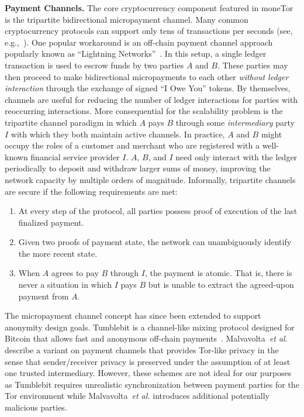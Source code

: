\medskip \noindent\textbf{Payment Channels.}
The core cryptocurrency component featured in moneTor is the tripartite bidirectional micropayment channel.
Many common cryptocurrency protocols can support only tens of transactions per seconds (see, e.g.,~\cite{team2018blockchain}).
One popular workaround is an off-chain payment channel approach popularly known as ``Lightning Networks''~\cite{poon2016bitcoin}.
In this setup, a single ledger transaction is used to escrow funds by two parties $A$ and $B$.
These parties may then proceed to make bidirectional micropayments to each other \emph{without ledger interaction} through the exchange of signed ``I Owe You'' tokens.
By themselves, channels are useful for reducing the number of ledger interactions for parties with reoccurring interactions.
More consequential for the scalability problem is the tripartite channel paradigm in which $A$ pays $B$ through some \emph{intermediary} party $I$ with which they both maintain active channels.
In practice, $A$ and $B$ might occupy the roles of a customer and merchant who are registered with a well-known financial service provider $I$.
$A$, $B$, and $I$ need only interact with the ledger periodically to deposit and withdraw larger sums of money, improving the network capacity by multiple orders of magnitude.
Informally, tripartite channels are secure if the following requirements are met:

\begin{enumerate}
\item At every step of the protocol, all parties possess proof of execution of the last finalized payment.
\item Given two proofs of payment state, the network can unambiguously identify the more recent state.
\item When $A$ agrees to pay $B$ through $I$, the payment is atomic.
  That is, there is never a situation in which $I$ pays $B$ but is unable to extract the agreed-upon payment from $A$.
\end{enumerate}

The micropayment channel concept has since been extended to support anonymity design goals.
Tumblebit is a channel-like mixing protocol designed for Bitcoin that allows fast and anonymous off-chain payments~\cite{heilman2017tumblebit}.
Malvavolta~\textit{et al.}~\cite{malavolta2017concurrency} describe a variant on payment channels that provides Tor-like privacy in the sense that sender/receiver privacy is preserved under the assumption of at least one trusted intermediary.
However, these schemes are not ideal for our purposes as Tumblebit requires unrealistic synchronization between payment parties for the Tor environment while Malvavolta~\textit{et al.}
introduces additional potentially malicious parties.

